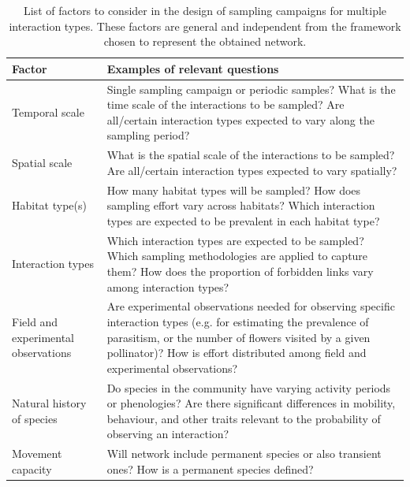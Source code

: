 \begin{table} \footnotesize
\caption[Sampling of multiple interaction types]{\color{Gray}List of factors to consider in the design of sampling campaigns for multiple interaction types. These factors are general and independent from the framework chosen to represent the obtained network.}\label{tab:table1.2}
\begin{tabularx}{\textwidth}{p{2cm} X}
\hline
Factor & Examples of relevant questions\\
\hline
Temporal scale &
Single sampling campaign or periodic samples? What is the time scale of the interactions to be sampled? Are all/certain interaction types expected to vary along the sampling period?\\

Spatial scale &
What is the spatial scale of the interactions to be sampled? Are all/certain interaction types expected to vary spatially?\\

Habitat type(s) &
How many habitat types will be sampled? How does sampling effort vary across habitats? Which interaction types are expected to be prevalent in each habitat type?\\

Interaction types &
Which interaction types are expected to be sampled? Which sampling methodologies are applied to capture them? How does the proportion of forbidden links vary among interaction types?\\

Field and experimental observations &
Are experimental observations needed for observing specific interaction types (e.g. for estimating the prevalence of parasitism, or the number of flowers visited by a given pollinator)? How is effort distributed among field and experimental observations?\\

Natural history of species &
Do species in the community have varying activity periods or phenologies? Are there significant differences in mobility, behaviour, and other traits relevant to the probability of observing an interaction?\\

Movement capacity &
Will network include permanent species or also transient ones? How is a permanent species defined?\\
\hline

\end{tabularx}

\end{table}

